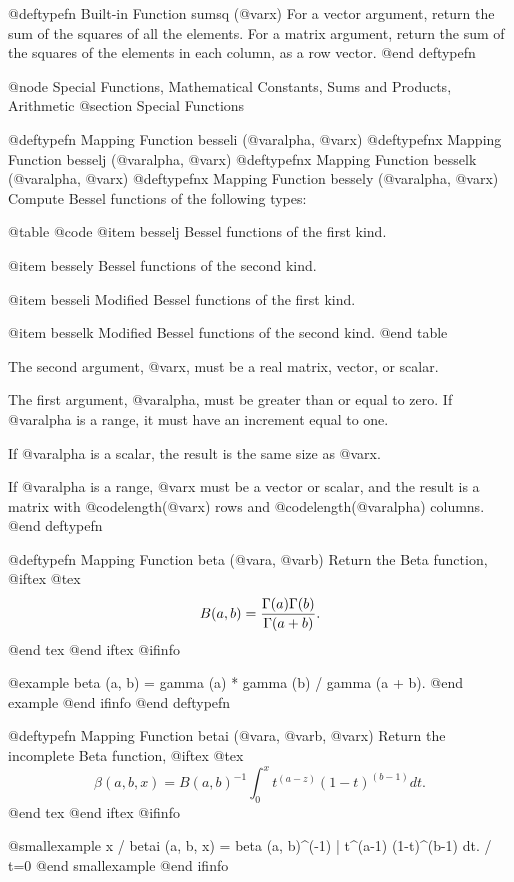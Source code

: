 @deftypefn {Built-in Function} {} sumsq (@var{x})
For a vector argument, return the sum of the squares of all the
elements.  For a matrix argument, return the sum of the squares of the
elements in each column, as a row vector.
@end deftypefn

@node Special Functions, Mathematical Constants, Sums and Products, Arithmetic
@section Special Functions

@deftypefn {Mapping Function} {} besseli (@var{alpha}, @var{x})
@deftypefnx {Mapping Function} {} besselj (@var{alpha}, @var{x})
@deftypefnx {Mapping Function} {} besselk (@var{alpha}, @var{x})
@deftypefnx {Mapping Function} {} bessely (@var{alpha}, @var{x})
Compute Bessel functions of the following types:

@table @code
@item besselj
Bessel functions of the first kind.

@item bessely
Bessel functions of the second kind.

@item besseli
Modified Bessel functions of the first kind.

@item besselk
Modified Bessel functions of the second kind.
@end table

The second argument, @var{x}, must be a real matrix, vector, or scalar.

The first argument, @var{alpha}, must be greater than or equal to zero.
If @var{alpha} is a range, it must have an increment equal to one.

If @var{alpha} is a scalar, the result is the same size as @var{x}.

If @var{alpha} is a range, @var{x} must be a vector or scalar, and the
result is a matrix with @code{length(@var{x})} rows and
@code{length(@var{alpha})} columns.
@end deftypefn

@deftypefn {Mapping Function} {} beta (@var{a}, @var{b})
Return the Beta function,
@iftex
@tex
$$
 B (a, b) = {\Gamma (a) \Gamma (b) \over \Gamma (a + b)}.
$$
@end tex
@end iftex
@ifinfo

@example
beta (a, b) = gamma (a) * gamma (b) / gamma (a + b).
@end example
@end ifinfo
@end deftypefn

@deftypefn {Mapping Function} {} betai (@var{a}, @var{b}, @var{x})
Return the incomplete Beta function,
@iftex
@tex
$$
 \beta (a, b, x) = B (a, b)^{-1} \int_0^x t^{(a-z)} (1-t)^{(b-1)} dt.
$$
@end tex
@end iftex
@ifinfo

@smallexample
                                    x
                                   /
betai (a, b, x) = beta (a, b)^(-1) | t^(a-1) (1-t)^(b-1) dt.
                                   /
                                t=0
@end smallexample
@end ifinfo

